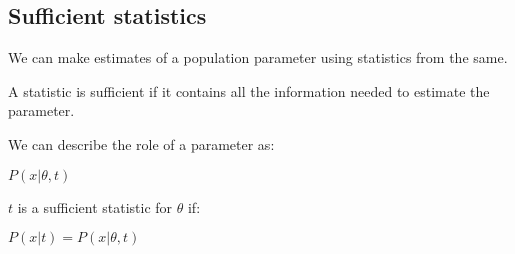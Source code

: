 
\subsection{Sufficient statistics}

We can make estimates of a population parameter using statistics from the same.

A statistic is sufficient if it contains all the information needed to estimate the parameter.

We can describe the role of a parameter as:

\(P(x|\theta, t)\)

\(t\) is a sufficient statistic for \(\theta \) if:

\(P(x|t)=P(x|\theta, t)\)

